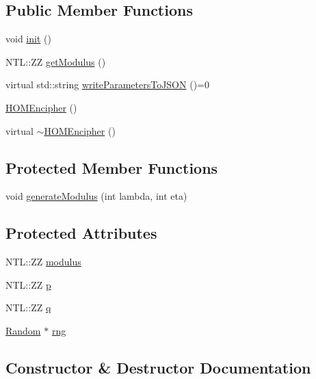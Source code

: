 \subsection*{Public Member Functions}
\begin{DoxyCompactItemize}
\item 
void \hyperlink{classHOMEncipher_aefdaccfe94ca8bd67a3ed1f5f045b04a}{init} ()
\item 
N\+T\+L\+::\+ZZ \hyperlink{classHOMEncipher_a43f920fd7feb8f3c9c6532c4935a6922}{get\+Modulus} ()
\item 
virtual std\+::string \hyperlink{classHOMEncipher_abf176e3fb85de6f0f6a2c96563397d39}{write\+Parameters\+To\+J\+S\+ON} ()=0
\item 
\hyperlink{classHOMEncipher_a08c76156f4f64433ead6ed2a1f142ffe}{H\+O\+M\+Encipher} ()
\item 
virtual \hyperlink{classHOMEncipher_a93b5c48425b0ac327757795703ecd2d7}{$\sim$\+H\+O\+M\+Encipher} ()
\end{DoxyCompactItemize}
\subsection*{Protected Member Functions}
\begin{DoxyCompactItemize}
\item 
void \hyperlink{classHOMEncipher_a6a715a6beed3174acc8d812d570462ca}{generate\+Modulus} (int lambda, int eta)
\end{DoxyCompactItemize}
\subsection*{Protected Attributes}
\begin{DoxyCompactItemize}
\item 
N\+T\+L\+::\+ZZ \hyperlink{classHOMEncipher_aa645061096356f6e2fd5ad3f0dfc1fc1}{modulus}
\item 
N\+T\+L\+::\+ZZ \hyperlink{classHOMEncipher_a57eb1b665612ec7caaa601af9b809866}{p}
\item 
N\+T\+L\+::\+ZZ \hyperlink{classHOMEncipher_ab9e6d7d4d4574c74a08169441e3213b2}{q}
\item 
\hyperlink{classRandom}{Random} $\ast$ \hyperlink{classHOMEncipher_a93a3cf6c4d8c7105380a2b13a08db774}{rng}
\end{DoxyCompactItemize}


\subsection{Constructor \& Destructor Documentation}
\mbox{\label{classHOMEncipher_a08c76156f4f64433ead6ed2a1f142ffe}} 
